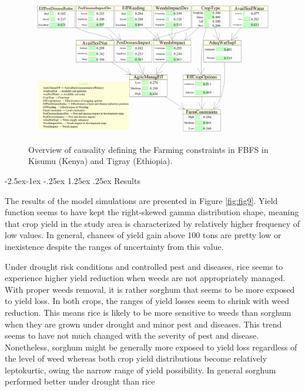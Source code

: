 \documentclass[12pt,oneside]{article}
\makeatletter
\renewcommand\paragraph{\@startsection{paragraph}{4}{\z@}%
            {-2.5ex\@plus -1ex \@minus -.25ex}%
            {1.25ex \@plus .25ex}%
            {\normalfont\normalsize\bfseries}}
\makeatother
\begin{document}
\begin{figure}[!htbp]

{\centering \includegraphics[width=1\linewidth,]{figures/Modelling_FBFS_Farming_Constraints} 

}

\caption{Overview of causality defining the Farming constraints in FBFS in Kisumu (Kenya) and Tigray (Ethiopia).}\label{fig:fig10}
\end{figure}

\hypertarget{IV233}{%
\paragraph{Results}\label{IV233}}

The results of the model simulations are presented in Figure \ref{fig:fig9}. Yield function seems to have kept the right-skewed gamma distribution shape, meaning that crop yield in the study area is characterized by relatively higher frequency of low values. In general, chances of yield gain above 100 tons are pretty low or inexistence despite the ranges of uncertainty from this value.

Under drought risk conditions and controlled pest and diseases, rice seems to experience higher yield reduction when weeds are not appropriately managed. With proper weeds removal, it is rather sorghum that seems to be more exposed to yield loss. In both crops, the ranges of yield losses seem to shrink with weed reduction. This means rice is likely to be more sensitive to weeds than sorghum when they are grown under drought and minor pest and diseases. This trend seems to have not much changed with the severity of pest and disease. Nonetheless, sorghum might be generally more exposed to yield loss regardless of the level of weed whereas both crop yield distributions become relatively leptokurtic, owing the narrow range of yield possibility. In general sorghum performed better under drought than rice
\end{document}
